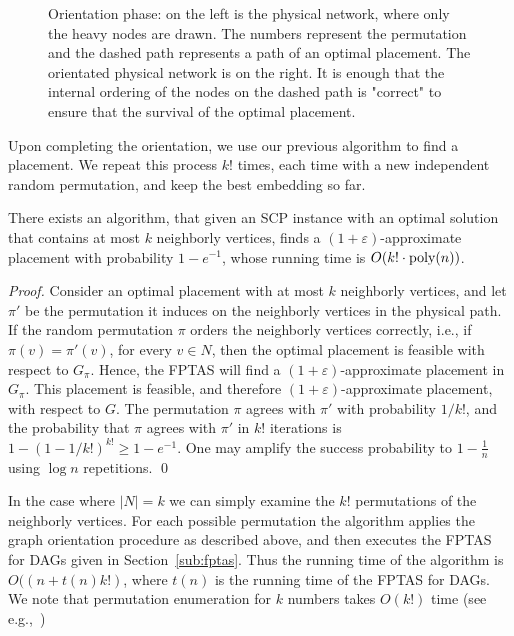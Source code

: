 \documentclass[runningheads]{llncs}
\newcommand{\inv}[1]{\frac{1}{#1}}
\newcommand{\abs}[1]{\left| #1 \right|}
\newcommand{\eps}{\varepsilon}
\newcommand{\scp}{\textsc{SCP}\xspace}
\begin{document}
\begin{figure}[t]
\centering
\scalebox{0.9}{
  
}
\caption{Orientation phase: on the left is the physical network, where
  only the heavy nodes are drawn.  The numbers represent the
  permutation and the dashed path represents a path of an optimal
  placement.  The orientated physical network is on the right.  It is
  enough that the internal ordering of the nodes on the dashed path is
  "correct" to ensure that the survival of the optimal placement. }
\label{fig:orientation}
\end{figure}

Upon completing the orientation, we use our previous algorithm to find
a placement.  We repeat this process $k!$ times, each time with a new
independent random permutation, and keep the best embedding so far.

\begin{theorem}
There exists an algorithm, that given an \scp instance with an optimal
solution that contains at most $k$ neighborly vertices, finds a
$(1+\eps)$-approximate placement with probability $1 - e^{-1}$, whose
running time is $O(k! \cdot \text{\rm poly}(n))$.
\end{theorem}
\begin{proof}
Consider an optimal placement with at most $k$ neighborly vertices,
and let $\pi'$ be the permutation it induces on the neighborly
vertices in the physical path.
%
If the random permutation $\pi$ orders the neighborly vertices
correctly, i.e., if $\pi(v) = \pi'(v)$, for every $v \in N$, then the
optimal placement is feasible with respect to $G_\pi$.  Hence, the
FPTAS will find a $(1+\eps)$-approximate placement in $G_\pi$.  This
placement is feasible, and therefore $(1+\eps)$-approximate placement,
with respect to $G$.
%
The permutation $\pi$ agrees with $\pi'$ with probability $1/k!$, and
the probability that $\pi$ agrees with $\pi'$ in $k!$ iterations is $1
- (1 - 1/k!)^{k!} \geq 1 - e^{-1}$.  One may amplify the success
probability to $1 - \inv{n}$ using $\log n$ repetitions.
%
\qed
\end{proof}


In the case where $\abs{N} = k$ we can simply examine the $k!$
permutations of the neighborly vertices.  For each possible
permutation the algorithm applies the graph orientation procedure as
described above, and then executes the FPTAS for DAGs given in
Section~\ref{sub:fptas}.  Thus the running time of the algorithm is
$O((n+t(n)k!)$, where $t(n)$ is the running time of the FPTAS for
DAGs.
%
We note that permutation enumeration for $k$ numbers takes $O(k!)$
time (see e.g.,~\cite{Even73,Sedgewick77})
\end{document}
